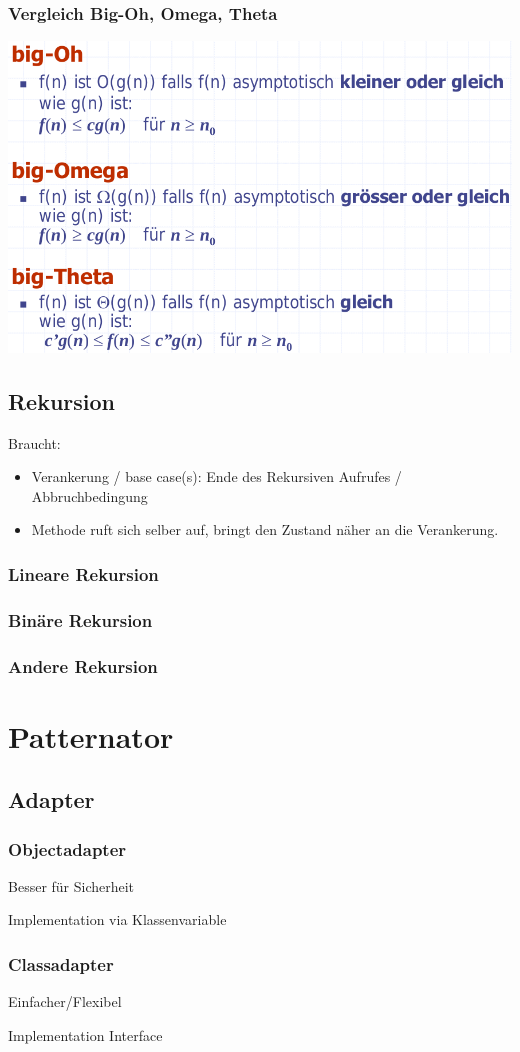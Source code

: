 \subsubsection{Vergleich Big-Oh, Omega, Theta}

\includegraphics[scale=0.3]{img/big-oh-vergleich.png}

\subsection{Rekursion}

Braucht:
\begin{itemize}
	\item Verankerung / base case(s): Ende des Rekursiven Aufrufes / Abbruchbedingung
	\item Methode ruft sich selber auf, bringt den Zustand näher an die Verankerung.
\end{itemize}

\subsubsection{Lineare Rekursion}

\subsubsection{Binäre Rekursion}

\subsubsection{Andere Rekursion}



\section{Patternator}

\subsection{Adapter}
\subsubsection{Objectadapter}

Besser für Sicherheit

Implementation via Klassenvariable

\subsubsection{Classadapter}

Einfacher/Flexibel

Implementation Interface


